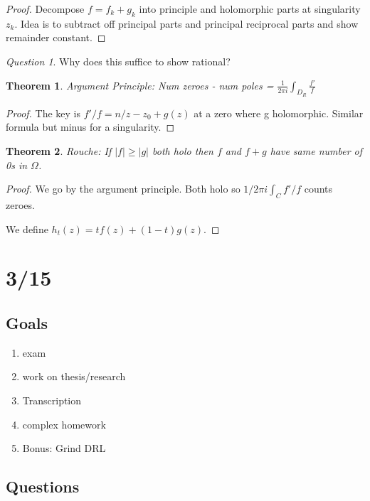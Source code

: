 \documentclass[11pt]{article}
\newtheorem{theorem}{Theorem}
\theoremstyle{remark}
\newtheorem{quest}{Question}
\begin{document}
\begin{proof}
	Decompose $f = f_k + g_k$ into principle and holomorphic parts at singularity $z_k$. Idea is to subtract off principal parts and principal reciprocal parts and show remainder constant. 
\end{proof}

\begin{quest}
	Why does this suffice to show rational?
\end{quest}

\begin{theorem}
	Argument Principle: Num zeroes - num poles = $\frac{1}{2 \pi i}\int_{D_R} \frac{f'}{f}$
\end{theorem}

\begin{proof}
	The key is $f'/f = n/z-z_0 + g(z)$ at a zero where g holomorphic. Similar formula but minus for a singularity. 
\end{proof}

\begin{theorem}
	Rouche: If $|f| \geq |g|$ both holo then $f$ and $f+g$ have same number of 0s in $\Omega$. 
\end{theorem}

\begin{proof}
	We go by the argument principle. Both holo so $1/2\pi i \int_C f'/f$ counts zeroes. 

	We define $h_t(z) = tf(z) +(1-t)g(z)$. 
\end{proof}

\section{3/15}

\subsection{Goals}

\begin{enumerate}
	\item exam
	\item work on thesis/research
	\item Transcription
	\item complex homework
	\item Bonus: Grind DRL
\end{enumerate}

\subsection{Questions}
\end{document}
